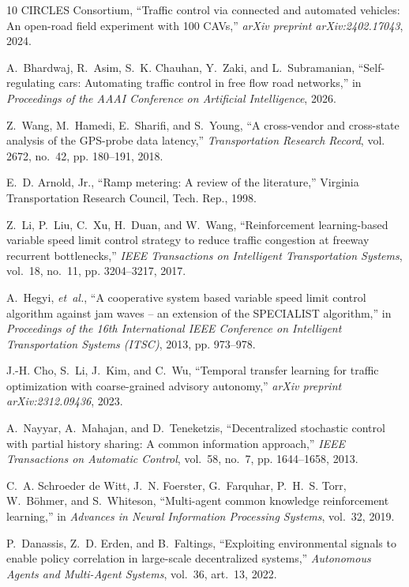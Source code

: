 \documentclass[letterpaper, 10pt, journal, twoside]{IEEEtran}
\begin{document}
\begin{thebibliography}{10}
{CIRCLES Consortium}, ``Traffic control via connected and automated vehicles: An open-road field experiment with 100 CAVs,'' \emph{arXiv preprint arXiv:2402.17043}, 2024.

A.~Bhardwaj, R.~Asim, S.~K. Chauhan, Y.~Zaki, and L.~Subramanian, ``Self-regulating cars: Automating traffic control in free flow road networks,'' in \emph{Proceedings of the AAAI Conference on Artificial Intelligence}, 2026.

Z.~Wang, M.~Hamedi, E.~Sharifi, and S.~Young, ``A cross-vendor and cross-state analysis of the {GPS}-probe data latency,'' \emph{Transportation Research Record}, vol. 2672, no.~42, pp. 180--191, 2018.

E.~D. Arnold, Jr., ``Ramp metering: A review of the literature,'' Virginia Transportation Research Council, Tech. Rep., 1998.

Z.~Li, P.~Liu, C.~Xu, H.~Duan, and W.~Wang, ``Reinforcement learning-based variable speed limit control strategy to reduce traffic congestion at freeway recurrent bottlenecks,'' \emph{IEEE Transactions on Intelligent Transportation Systems}, vol.~18, no.~11, pp. 3204--3217, 2017.

A.~Hegyi, \emph{et~al.}, ``A cooperative system based variable speed limit control algorithm against jam waves -- an extension of the {SPECIALIST} algorithm,'' in \emph{Proceedings of the 16th International IEEE Conference on Intelligent Transportation Systems (ITSC)}, 2013, pp. 973--978.

J.-H. Cho, S.~Li, J.~Kim, and C.~Wu, ``Temporal transfer learning for traffic optimization with coarse-grained advisory autonomy,'' \emph{arXiv preprint arXiv:2312.09436}, 2023.

A.~Nayyar, A.~Mahajan, and D.~Teneketzis, ``Decentralized stochastic control with partial history sharing: A common information approach,'' \emph{IEEE Transactions on Automatic Control}, vol.~58, no.~7, pp. 1644--1658, 2013.

C.~A. Schroeder de Witt, J.~N. Foerster, G.~Farquhar, P.~H.~S. Torr, W.~B{\"o}hmer, and S.~Whiteson, ``Multi-agent common knowledge reinforcement learning,'' in \emph{Advances in Neural Information Processing Systems}, vol.~32, 2019.

P.~Danassis, Z.~D. Erden, and B.~Faltings, ``Exploiting environmental signals to enable policy correlation in large-scale decentralized systems,'' \emph{Autonomous Agents and Multi-Agent Systems}, vol.~36, art.~13, 2022.


\end{thebibliography}
\end{document}
